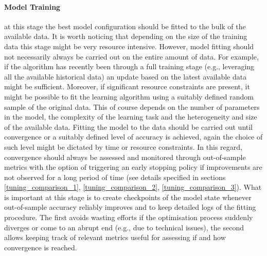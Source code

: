 \paragraph*{Model Training} at this stage the best model configuration should be fitted to the bulk of the available data. It is worth noticing that depending on the size of the training data this stage might be very resource intensive. However, model fitting should not necessarily always be carried out on the entire amount of data. For example, if the algorithm has recently been through a full training stage (e.g., leveraging all the available historical data) an update based on the latest available data might be sufficient. Moreover, if significant resource constraints are present, it might be possible to fit the learning algorithm using a suitably defined random sample of the original data. This of course depends on the number of parameters in the model, the complexity of the learning task and the heterogeneity and size of the available data. Fitting the model to the data should be carried out until convergence or a suitably defined level of accuracy is achieved, again the choice of such level might be dictated by time or resource constraints. In this regard, convergence should always be assessed and monitored through out-of-sample metrics with the option of triggering an early stopping policy if improvements are not observed for a long period of time (see details specified in sections \ref{tuning_comparison_1}, \ref{tuning_comparison_2}, \ref{tuning_comparison_3}). What is important at this stage is to create checkpoints of the model state whenever out-of-sample accuracy reliably improves and to keep detailed logs of the fitting procedure. The first avoids wasting efforts if the optimisation process suddenly diverges or come to an abrupt end (e.g., due to technical issues), the second allows keeping track of relevant metrics useful for assessing if and how convergence is reached.

